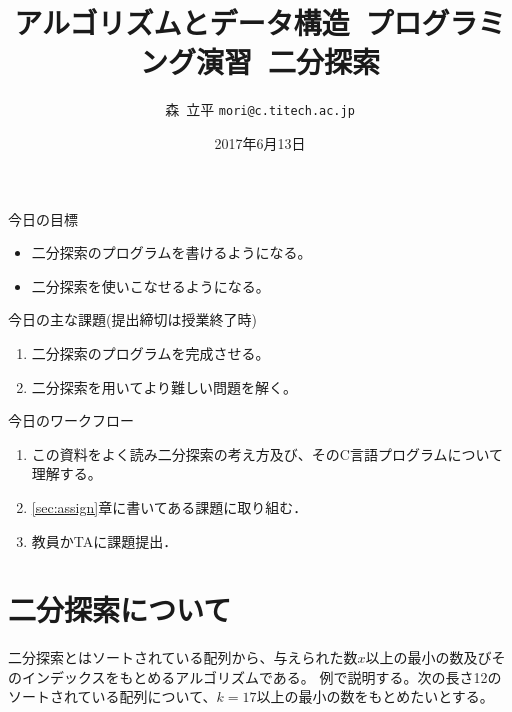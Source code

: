 \documentclass[a4paper,twoside,onecolumn,openany,article,10pt]{memoir}
\title{アルゴリズムとデータ構造~プログラミング演習~二分探索}
\date{2017年6月13日}
\author{森~立平 \texttt{mori@c.titech.ac.jp}}
\theoremstyle{remark}
\begin{document}
\maketitle


\noindent
今日の目標
\begin{itemize}
\item 二分探索のプログラムを書けるようになる。
\item 二分探索を使いこなせるようになる。
\end{itemize}

\noindent
今日の主な課題(提出締切は授業終了時)
\begin{enumerate}
\item 二分探索のプログラムを完成させる。
\item 二分探索を用いてより難しい問題を解く。
\end{enumerate}

\noindent
今日のワークフロー
\begin{enumerate}
\item この資料をよく読み二分探索の考え方及び、そのC言語プログラムについて理解する。
\item \ref{sec:assign}章に書いてある課題に取り組む．
\item 教員かTAに課題提出．
\end{enumerate}


\section{二分探索について}
二分探索とはソートされている配列から、与えられた数$x$以上の最小の数及びそのインデックスをもとめるアルゴリズムである。
例で説明する。次の長さ12のソートされている配列について、$k=17$以上の最小の数をもとめたいとする。
\end{document}
